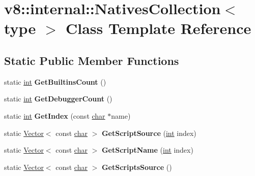 \hypertarget{classv8_1_1internal_1_1NativesCollection}{}\section{v8\+:\+:internal\+:\+:Natives\+Collection$<$ type $>$ Class Template Reference}
\label{classv8_1_1internal_1_1NativesCollection}
\subsection*{Static Public Member Functions}
\begin{DoxyCompactItemize}
\item 
\mbox{\label{classv8_1_1internal_1_1NativesCollection_a81e3ac733b0a8f5e56af13b29b41e1cc}} 
static \mbox{\hyperlink{classint}{int}} {\bfseries Get\+Builtins\+Count} ()
\item 
\mbox{\label{classv8_1_1internal_1_1NativesCollection_a2229a9268e522796a620c45d2fb16d48}} 
static \mbox{\hyperlink{classint}{int}} {\bfseries Get\+Debugger\+Count} ()
\item 
\mbox{\label{classv8_1_1internal_1_1NativesCollection_a7a8276ff535fb90fef0571092dbf56e1}} 
static \mbox{\hyperlink{classint}{int}} {\bfseries Get\+Index} (const \mbox{\hyperlink{classchar}{char}} $\ast$name)
\item 
\mbox{\label{classv8_1_1internal_1_1NativesCollection_a0bf9320566066a3b5a64b42908409af4}} 
static \mbox{\hyperlink{classv8_1_1internal_1_1Vector}{Vector}}$<$ const \mbox{\hyperlink{classchar}{char}} $>$ {\bfseries Get\+Script\+Source} (\mbox{\hyperlink{classint}{int}} index)
\item 
\mbox{\label{classv8_1_1internal_1_1NativesCollection_a5221c579647964d5872e507401f114a5}} 
static \mbox{\hyperlink{classv8_1_1internal_1_1Vector}{Vector}}$<$ const \mbox{\hyperlink{classchar}{char}} $>$ {\bfseries Get\+Script\+Name} (\mbox{\hyperlink{classint}{int}} index)
\item 
\mbox{\label{classv8_1_1internal_1_1NativesCollection_aaee8d7f1d766a04724e785123c8b6254}} 
static \mbox{\hyperlink{classv8_1_1internal_1_1Vector}{Vector}}$<$ const \mbox{\hyperlink{classchar}{char}} $>$ {\bfseries Get\+Scripts\+Source} ()
\end{DoxyCompactItemize}


